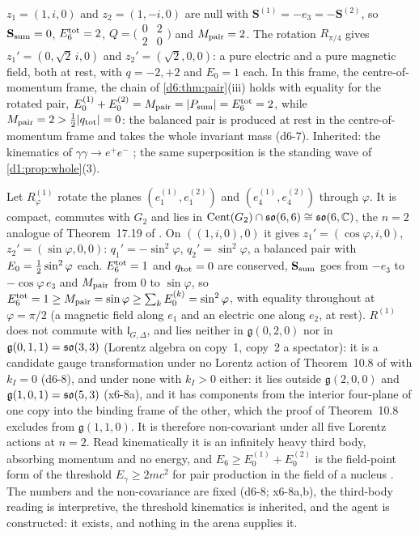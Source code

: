 \begin{example}
\label{d6:ex:bw}
$z_1=(1,i,0)$ and $z_2=(1,-i,0)$ are null with $\mathbf S^{(1)}=-e_3=-\mathbf S^{(2)}$, so $\mathbf S_{\rm sum}=0$, $E_6^{\rm tot}=2$,
$Q=\bigl(\begin{smallmatrix}0&2\\2&0\end{smallmatrix}\bigr)$ and $M_{\rm pair}=2$. The rotation $R_{\pi/4}$ gives $z_1'=(0,\sqrt2\,i,0)$ and
$z_2'=(\sqrt2,0,0)$: a pure electric and a pure magnetic field, both at rest, with $q=-2,+2$ and $E_0=1$ each. In this frame, the centre-of-momentum frame, the chain of
\cref{d6:thm:pair}(iii) holds with equality for the rotated pair, $E_0^{(1)}+E_0^{(2)}=M_{\rm pair}=|P_{\rm sum}|=E_6^{\rm tot}=2$, while
$M_{\rm pair}=2>\tfrac12|q_{\rm tot}|=0$: the balanced pair is produced at rest in the centre-of-momentum frame and takes the whole invariant mass
(d6-7). Inherited: the kinematics of $\gamma\gamma\to e^+e^-$ \cite{BreitWheeler34}; the same superposition is the standing wave of
\cref{d1:prop:whole}(3).
\end{example}

\begin{example}
\label{d6:ex:R1}
Let $R^{(1)}_\varphi$ rotate the planes $(e^{(1)}_1,e^{(2)}_1)$ and $(e^{(1)}_4,e^{(2)}_4)$ through $\varphi$. It is compact, commutes with $G_2$ and lies in
$\operatorname{Cent}(G_2)\cap\mathfrak{so}(6,6)\cong\mathfrak{so}(6,\mathbb{C})$, the $n=2$ analogue of Theorem~17.19 of \cite{ES17}. On $((1,i,0),0)$ it gives $z_1'=(\cos\varphi,i,0)$,
$z_2'=(\sin\varphi,0,0)$: $q_1'=-\sin^2\varphi$, $q_2'=\sin^2\varphi$, a balanced pair with $E_0=\tfrac12\sin^2\varphi$ each. $E_6^{\rm tot}=1$ and $q_{\rm tot}=0$
are conserved, $\mathbf S_{\rm sum}$ goes from $-e_3$ to $-\cos\varphi\,e_3$ and $M_{\rm pair}$ from $0$ to $\sin\varphi$, so
$E_6^{\rm tot}=1\ge M_{\rm pair}=\sin\varphi\ge\sum_kE_0^{(k)}=\sin^2\varphi$, with equality throughout at $\varphi=\pi/2$ (a magnetic field along $e_1$ and
an electric one along $e_2$, at rest). $R^{(1)}$ does not commute with $\mathfrak l_{G,\Delta}$, and lies neither in $\mathfrak g(0,2,0)$ nor in
$\mathfrak g(0,1,1)=\mathfrak{so}(3,3)$ (Lorentz algebra on copy~1, copy~2 a spectator): it is a candidate gauge transformation under no Lorentz action of
Theorem~10.8 of \cite{ES17} with $k_I=0$ (d6-8), and under none with $k_I>0$ either: it lies outside $\mathfrak g(2,0,0)$ and
$\mathfrak g(1,0,1)=\mathfrak{so}(5,3)$ (x6-8a), and it has components from the interior four-plane of one copy into the binding frame of the other,
which the proof of Theorem~10.8 excludes from $\mathfrak g(1,1,0)$. It is therefore non-covariant under all five Lorentz actions at $n=2$. Read kinematically it is an infinitely heavy third body, absorbing momentum and no energy, and
$E_6\ge E_0^{(1)}+E_0^{(2)}$ is the field-point form of the threshold $E_\gamma\ge2mc^2$ for pair production in the field of a nucleus
\cite{BetheHeitler34}. The numbers and the non-covariance are fixed (d6-8; x6-8a,b), the third-body reading is interpretive, the threshold
kinematics is inherited, and the agent is constructed: it exists, and nothing in the arena supplies it.
\end{example}

